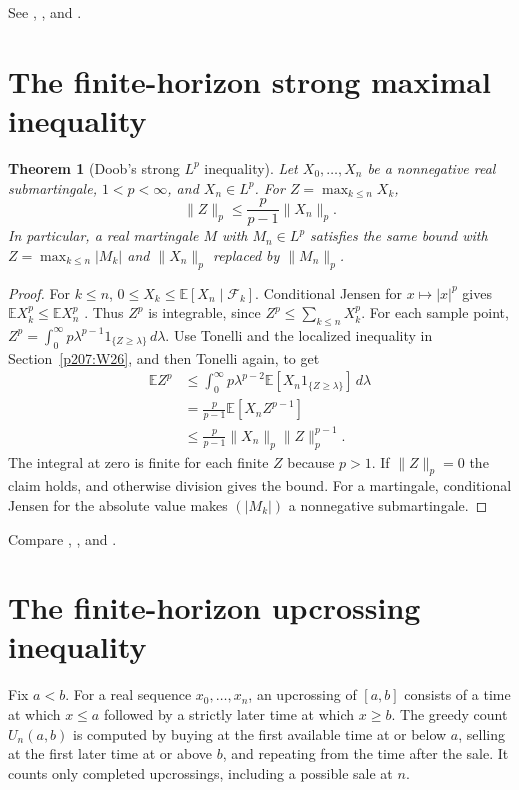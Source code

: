 \documentclass[11pt,oneside,openany]{book}
\theoremstyle{plain}
\newtheorem{theorem}{Theorem}[chapter]
\theoremstyle{definition}
\theoremstyle{remark}
\begin{document}
See \cite[Section 14.6]{Williams}, \cite[Theorem 9.16]{Kallenberg},
and \cite[Theorem 4.4.2]{Durrett}.

\section{The finite-horizon strong maximal inequality}\label{p207:W27}

\begin{theorem}[Doob's strong \(L^p\) inequality]
Let \(X_0,\ldots,X_n\) be a nonnegative real submartingale,
\(1<p<\infty\), and \(X_n\in L^p\). For \(Z=\max_{k\le n}X_k\),
\[
     \lVert Z\rVert_p\le \frac{p}{p-1}\lVert X_n\rVert_p .
\]
In particular, a real martingale \(M\) with \(M_n\in L^p\) satisfies
the same bound with \(Z=\max_{k\le n}|M_k|\) and
\(\lVert X_n\rVert_p\) replaced by \(\lVert M_n\rVert_p\).
\end{theorem}
\begin{proof}
For \(k\le n\), \(0\le X_k\le \mathbb E[X_n\mid\mathcal F_k]\).
Conditional Jensen for \(x\mapsto |x|^p\) gives
\(\mathbb E X_k^p\le\mathbb E X_n^p\)
\cite[conditional Jensen theorem]{P105}. Thus \(Z^p\) is integrable,
since \(Z^p\le\sum_{k\le n}X_k^p\). For each sample point,
\(Z^p=\int_0^\infty p\lambda^{p-1}1_{\{Z\ge\lambda\}}\,d\lambda\).
Use Tonelli and the localized inequality in
Section~\ref{p207:W26}, and then Tonelli again, to get
\begin{align*}
 \mathbb E Z^p
 &\le \int_0^\infty p\lambda^{p-2}
                 \mathbb E[X_n1_{\{Z\ge\lambda\}}]\,d\lambda \\
 &= \frac{p}{p-1}\mathbb E[X_n Z^{p-1}]\\
 &\le \frac{p}{p-1}\lVert X_n\rVert_p\lVert Z\rVert_p^{p-1}.
\end{align*}
The integral at zero is finite for each finite \(Z\) because \(p>1\).
If \(\lVert Z\rVert_p=0\) the claim holds, and otherwise division
gives the bound. For a martingale, conditional Jensen for the
absolute value makes \((|M_k|)\) a nonnegative submartingale.
\end{proof}

Compare \cite[Section 14.11]{Williams},
\cite[Theorem 9.17]{Kallenberg}, and \cite[Theorem 4.4.4]{Durrett}.

\section{The finite-horizon upcrossing inequality}\label{p207:W28}

Fix \(a<b\). For a real sequence \(x_0,\ldots,x_n\), an upcrossing
of \([a,b]\) consists of a time at which \(x\le a\) followed by
a strictly later time at which \(x\ge b\). The greedy count
\(U_n(a,b)\) is computed by buying at the first available time
at or below \(a\), selling at the first later time at or above
\(b\), and repeating from the time after the sale. It counts
only completed upcrossings, including a possible sale at \(n\).
\end{document}
